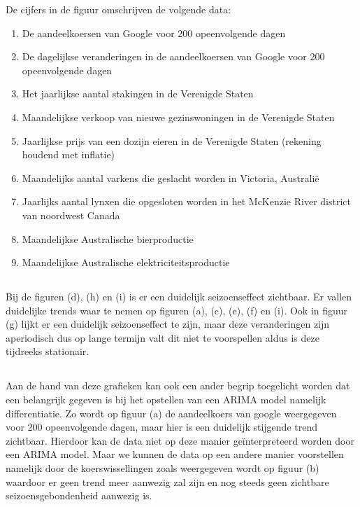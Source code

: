 De cijfers in de figuur omschrijven de volgende data:

\begin{enumerate}[label=(\,\alph*)\,]
    \item De aandeelkoersen van Google voor 200 opeenvolgende dagen
    \item De dagelijkse veranderingen in de aandeelkoersen van Google voor 200 opeenvolgende dagen
    \item Het jaarlijkse aantal stakingen in de Verenigde Staten
    \item Maandelijkse verkoop van nieuwe gezinswoningen in de Verenigde Staten
    \item Jaarlijkse prijs van een dozijn eieren in de Verenigde Staten (rekening houdend met inflatie)
    \item Maandelijks aantal varkens die geslacht worden in Victoria, Australi\"{e}
    \item Jaarlijks aantal lynxen die opgesloten worden in het McKenzie River district van noordwest Canada
    \item Maandelijkse Australische bierproductie
    \item Maandelijkse Australische elektriciteitsproductie
\end{enumerate}

\subsection{}

Bij de figuren (d), (h) en (i) is er een duidelijk seizoenseffect zichtbaar. Er vallen duidelijke trends waar te nemen op figuren (a), (c), (e), (f) en (i). Ook in figuur (g) lijkt er een duidelijk seizoenseffect te zijn, maar deze veranderingen zijn aperiodisch dus op lange termijn valt dit niet te voorspellen aldus is deze tijdreeks stationair.


\subsection{}

Aan de hand van deze grafieken kan ook een ander begrip toegelicht worden dat een belangrijk gegeven is bij het opstellen van een ARIMA model namelijk differentiatie. Zo wordt op figuur (a) de aandeelkoers van google weergegeven voor 200 opeenvolgende dagen, maar hier is een duidelijk stijgende trend zichtbaar. Hierdoor kan de data niet op deze manier ge\"{i}nterpreteerd worden door een ARIMA model. Maar we kunnen de data op een andere manier voorstellen namelijk door de koerswissellingen zoals weergegeven wordt op figuur (b) waardoor er geen trend meer aanwezig zal zijn en nog steeds geen zichtbare seizoensgebondenheid aanwezig is. 

